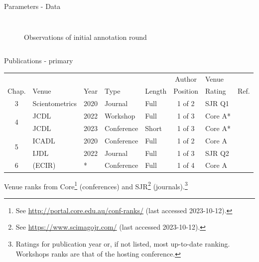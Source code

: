 \documentclass[en,16:9,smallfoot]{sdqbeamer}
\begin{document}
\begin{frame}{Parameters - Data}
\begin{columns}
\begin{figure}
{                }
                \caption{Observations of initial annotation round}
                \label{fig:init-annot}
            \end{figure}
   \end{columns}
   \end{frame}


   \begin{frame}{Publications - primary}
    \begin{table}
    \centering
      \begin{tabular}{cllllclr}
        \hline
        \ & \ & \ & \ & \ & Author & Venue & \ \\
        Chap. & Venue & Year & Type & Length & Position & Rating & Ref. \\
        \hline
        3 & Scientometrics & 2020 & Journal & Full & 1 of 2 & SJR Q1 & \cite{Saier2020} \\
        \cline{1-1}
        \multirow{2}{*}{4} & JCDL & 2022 & Workshop & Full & 1 of 3 & Core A* & \cite{Saier2022ULITE} \\
        \ & JCDL & 2023 & Conference & Short & 1 of 3 & Core A* & \cite{Saier2023unarXive} \\
        \cline{1-1}
        \multirow{2}{*}{5} & ICADL & 2020 & Conference & Full & 1 of 2 & Core A & \cite{Saier2020xling} \\
        \ & IJDL & 2022 & Journal & Full & 1 of 3 & SJR Q2 & \cite{Saier2021} \\
        \cline{1-1}
        6 & (ECIR) & * & Conference & Full & 1 of 4 & Core A & \cite{Saier2024HyperPIE} \\
        \hline
        \end{tabular}
    \end{table}

    Venue ranks from Core\footnote{See \url{http://portal.core.edu.au/conf-ranks/} (last accessed 2023-10-12).} (conferences) and SJR\footnote{See \url{https://www.scimagojr.com/} (last accessed 2023-10-12).} (journals).\footnote{Ratings for publication year or, if not listed, most up-to-date ranking. Workshops ranks are that of the hosting conference.}

   \end{frame}
\end{document}
